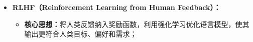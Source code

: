 \documentclass[../main.tex]{subfiles}
\begin{document}
\begin{enumerate}
\begin{itemize}
        \item \textbf{RLHF（Reinforcement Learning from Human Feedback）：}
        \begin{itemize}
            \item \textbf{核心思想：}将人类反馈纳入奖励函数，利用强化学习优化语言模型，使其输出更符合人类目标、偏好和需求；
        \end{itemize}
    \end{itemize}
\end{enumerate}
\end{document}
